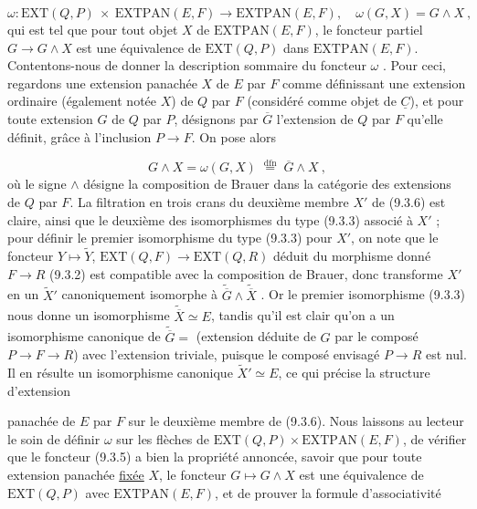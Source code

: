 \begin{equation}\tag{9.3.5}
\omega : \mathrm{EXT}(Q,P) \ \times \ \mathrm{EXTPAN}(E,F) \longrightarrow \mathrm{EXTPAN}(E,F), \quad \omega(G,X) = G \wedge X \ ,
\end{equation}
qui est tel que pour tout objet $X$ de $\mathrm{EXTPAN}(E,F)$, le foncteur partiel $G \longrightarrow G \wedge X$ est une équivalence de $\mathrm{EXT}(Q,P)$ dans $\mathrm{EXTPAN}(E,F)$. Contentons-nous de donner la description sommaire du foncteur $\omega$ . Pour ceci, regardons une extension panachée $X$ de $E$ par $F$ comme définissant une extension ordinaire (également notée $X$) de $Q$ par $F$ (considéré comme objet de $\underline{C}$), et pour toute extension $G$ de $Q$ par $P$, désignons par $\overline{G}$ l'extension de $Q$ par $F$ qu'elle définit, grâce à l'inclusion $P \longrightarrow F$. On pose alors

\begin{equation}\tag{9.3.6}
G \wedge X = \omega(G,X) \;\overset{\mathrm{dfn}}{=}\; \overline{G} \wedge X \ ,
\end{equation}
où le signe $\wedge$ désigne la composition de Brauer dans la catégorie des extensions de $Q$ par $F$. La filtration en trois crans du deuxième membre $X'$ de (9.3.6) est claire, ainsi que le deuxième des isomorphismes du type (9.3.3) associé à $X'$ ; pour définir le premier isomorphisme du type (9.3.3) pour $X'$, on note que le foncteur $Y \longmapsto \widetilde{Y}$, $\mathrm{EXT}(Q,F) \longrightarrow \mathrm{EXT}(Q,R)$ déduit du morphisme donné $F \longrightarrow R$ (9.3.2) est compatible avec la composition de Brauer, donc transforme $X'$ en un $\widetilde{X}'$ canoniquement isomorphe à $\widetilde{\overline{G}} \wedge \widetilde{\overline{X}}$ . Or le premier isomorphisme (9.3.3) nous donne un isomorphisme $\widetilde{\overline{X}} \simeq E$, tandis qu'il est clair qu'on a un isomorphisme canonique de $\widetilde{\overline{G}} =$ (extension déduite de $G$ par le composé $P \longrightarrow F \longrightarrow R$) avec l'extension triviale, puisque le composé envisagé $P \longrightarrow R$ est nul. Il en résulte un isomorphisme canonique $\widetilde{X}' \simeq E$, ce qui précise la structure d'extension



panachée de $E$ par $F$ sur le deuxième membre de (9.3.6). Nous laissons au lecteur le soin de définir $\omega$ sur les flèches de $\mathrm{EXT}(Q,P) \times \mathrm{EXTPAN}(E,F)$, de vérifier que le foncteur (9.3.5) a bien la propriété annoncée, savoir que pour toute extension panachée \underline{fixée} $X$, le foncteur $G \longmapsto G \wedge X$ est une équivalence de $\mathrm{EXT}(Q,P)$ avec $\mathrm{EXTPAN}(E,F)$, et de prouver la formule d'associativité

